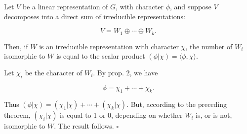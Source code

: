 Let $V$ be a linear representation of $G$, with character $\phi$, and suppose $V$ decomposes into a direct sum of irreducible representations:

$$V = W_1 \oplus \cdots \oplus W_k.$$

Then, if $W$ is an irreducible representation with character $\chi$, the number of $W_i$ isomorphic to $W$ is equal to the scalar product $(\phi|\chi) = \langle \phi, \chi \rangle.$

Let $\chi_i$ be the character of $W_i$. By prop. 2, we have

$$\phi = \chi_1 + \cdots + \chi_k.$$

Thus $(\phi|\chi) = (\chi_1|\chi) + \cdots + (\chi_k|\chi)$. But, according to the preceding theorem, $(\chi_i|\chi)$ is equal to 1 or 0, depending on whether $W_i$ is, or is not, isomorphic to $W$. The result follows. $\square$
